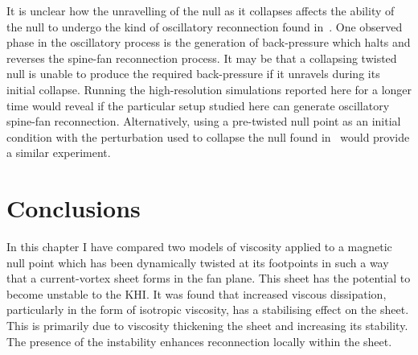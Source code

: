 It is unclear how the unravelling of the null as it collapses affects the ability of the null to undergo the kind of oscillatory reconnection found in~\cite{thurgoodThreedimensionalOscillatoryMagnetic2017}. One observed phase in the oscillatory process is the generation of back-pressure which halts and reverses the spine-fan reconnection process. It may be that a collapsing twisted null is unable to produce the required back-pressure if it unravels during its initial collapse. Running the high-resolution simulations reported here for a longer time would reveal if the particular setup studied here can generate oscillatory spine-fan reconnection. Alternatively, using a pre-twisted null point as an initial condition with the perturbation used to collapse the null found in~\cite{thurgoodThreedimensionalOscillatoryMagnetic2017} would provide a similar experiment.




\section{Conclusions}
\label{sec:khi_conclusions}

In this chapter I have compared two models of viscosity applied to a magnetic null point which has been dynamically twisted at its footpoints in such a way that a current-vortex sheet forms in the fan plane. This sheet has the potential to become unstable to the KHI. It was found that increased viscous dissipation, particularly in the form of isotropic viscosity, has a stabilising effect on the sheet. This is primarily due to viscosity thickening the sheet and increasing its stability. The presence of the instability enhances reconnection locally within the sheet.

